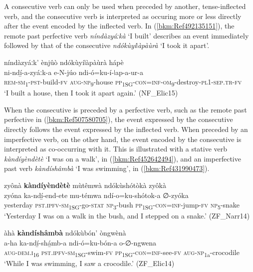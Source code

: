 A consecutive verb can only be used when preceded by another, tense-in\-flect\-ed verb, and the consecutive verb is interpreted as occuring more or less directly after the event encoded by the inflected verb. In (\ref{bkm:Ref492135151}), the remote past perfective verb \textit{níndàzyáːkà} ‘I built’ describes an event immediately followed by that of the consecutive \textit{ndókùyíǀàpàùrà} ‘I took it apart’.

\ea
\label{bkm:Ref492135151}
\label{bkm:Ref507580705}
níndàzyáːk’ ènjûò ndókùyíǀàpàùrà hápè\\
\gll ni-ndí̲-a-zyáːk-a    e-N-júo ndi-ó=ku-í-ǀap-a-ur-a \\
\textsc{rem}-\textsc{sm}\textsubscript{1}-\textsc{pst}-build-\textsc{fv}  \textsc{aug}-\textsc{np}\textsubscript{9}-house
\textsc{pp}\textsubscript{1SG}-\textsc{con}=\textsc{inf}-\textsc{om}\textsubscript{9}-destroy-\textsc{pl}1-\textsc{sep}.\textsc{tr}-\textsc{fv}\\
\glt ‘I built a house, then I took it apart again.’ (NF\_Elic15)
\z

When the consecutive is preceded by a perfective verb, such as the remote past perfective in (\ref{bkm:Ref507580705}), the event expressed by the consecutive directly follows the event expressed by the inflected verb. When preceded by an imperfective verb, on the other hand, the event encoded by the consecutive is interpreted as co-occurring with it. This is illustrated with a stative verb \textit{kàndíyèndètè} ‘I was on a walk’, in (\ref{bkm:Ref452642494}), and an imperfective past verb \textit{kàndíshâmbà} ‘I was swimming’, in (\ref{bkm:Ref431990473}).

\ea
\label{bkm:Ref452642494}
zyônà \textbf{kàndíyèndètè} mùtêmwà ndókùshótòkà zyôkà\\
\gll zyóna    ka-ndí̲-end-ete    mu-témwa ndí-o=ku-shótok-a    ∅-zyóka \\
yesterday  \textsc{pst}.\textsc{ipfv}-\textsc{sm}\textsubscript{1SG}-go-\textsc{stat}  \textsc{np}\textsubscript{3}-bush
\textsc{pp}\textsubscript{1SG}-\textsc{con}=\textsc{inf}-jump-\textsc{fv}  \textsc{np}\textsubscript{5}-snake\\
\glt ‘Yesterday I was on a walk in the bush, and I stepped on a snake.’ (ZF\_Narr14)
\z

\newpage
\ea
\label{bkm:Ref431990473}
àhà \textbf{kàndíshâmbà} ndókùbón’ òngwènà\\
\gll a-ha    ka-ndí̲-shá̲mb-a ndi-ó=ku-bón-a    o-∅-ngwena \\
\textsc{aug}-\textsc{dem}.\textsc{i}\textsubscript{16}  \textsc{pst}.\textsc{ipfv}-\textsc{sm}\textsubscript{1SG}-swim-\textsc{fv}
\textsc{pp}\textsubscript{1SG}-\textsc{con}=\textsc{inf}-see-\textsc{fv}  \textsc{aug}-\textsc{np}\textsubscript{1a}-crocodile\\
\glt ‘While I was swimming, I saw a crocodile.’ (ZF\_Elic14)
\z

